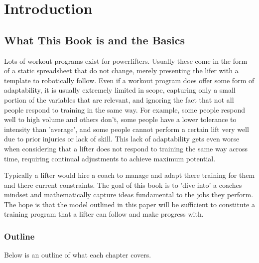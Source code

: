\part{Introduction}
\label{sec:Introduction}

\chapter{What This Book is and the Basics}

Lots of workout programs exist for powerlifters. Usually these come in the form of a static spreadsheet that do not change, merely presenting the lifer with a template to robotically follow. Even if a workout program does offer some form of adaptability, it is usually extremely limited in scope, capturing only a small portion of the variables that are relevant, and ignoring the fact that not all people respond to training in the same way. For example, some people respond well to high volume and others don't, some people have a lower tolerance to intensity than 'average', and some people cannot perform a certain lift very well due to prior injuries or lack of skill. This lack of adaptability gets even worse when considering that a lifter does not respond to training the same way across time, requiring continual adjustments to achieve maximum potential.

Typically a lifter would hire a coach to manage and adapt there training for them and there current constraints. The goal of this book is to 'dive into' a coaches mindset and mathematically capture ideas fundamental to the jobs they perform. The hope is that the model outlined in this paper will be sufficient to constitute a training program that a lifter can follow and make progress with.

\section{Outline}
\label{sec:Outline}

Below is an outline of what each chapter covers.

